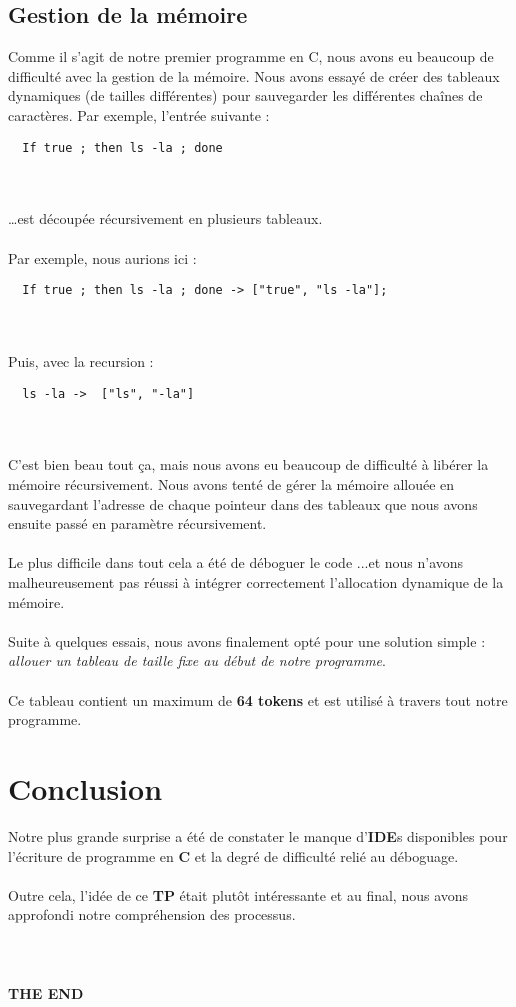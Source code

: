 \documentclass{article}
\begin{document}
\subsection{Gestion de la mémoire}

Comme il s’agit de notre premier programme en C, nous avons eu beaucoup de difficulté avec la gestion de la mémoire. Nous avons essayé de créer des tableaux dynamiques (de tailles différentes) pour sauvegarder les différentes chaînes de caractères. Par exemple, l’entrée suivante :

\begin{verbatim}
  If true ; then ls -la ; done    
\end{verbatim}
\\\\
…est découpée récursivement en plusieurs tableaux. 
\\\\
Par exemple, nous aurions ici :
\begin{verbatim}
  If true ; then ls -la ; done -> ["true", "ls -la"];
\end{verbatim}
\\\\
Puis, avec la recursion :
\begin{verbatim}
  ls -la ->  ["ls", "-la"]
\end{verbatim}
\\\\
C’est bien beau tout ça, mais nous avons eu beaucoup de difficulté à libérer la mémoire récursivement. Nous avons tenté de gérer la mémoire allouée en sauvegardant l’adresse de chaque pointeur dans des tableaux que nous avons ensuite passé en paramètre récursivement.
\\\\
Le plus difficile dans tout cela a été de déboguer le code ...et nous n'avons malheureusement pas réussi à intégrer correctement l'allocation dynamique de la mémoire.
\\\\
Suite à quelques essais, nous avons finalement opté pour une solution simple : \textit{allouer un tableau de taille fixe au début de notre programme}.
\\\\
Ce tableau contient un maximum de \textbf{64 tokens} et est utilisé à travers tout notre programme.

\section{Conclusion}

Notre plus grande surprise a été de constater le manque d’\textbf{IDE}s disponibles pour l'écriture de programme en \textbf{C} et la degré de difficulté relié au déboguage.
\\\\
Outre cela, l'idée de ce \textbf{TP} était plutôt intéressante et au final, nous avons  approfondi notre compréhension des processus. 
\\\\
\\\\
\textbf{THE END}
\end{document}
